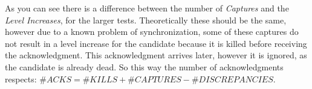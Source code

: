 	\begin{table}[h] 
		\centering
		\caption{Tests summary}\label{tab:testtable}
	\end{table}

	As you can see there is a difference between the number of \textit{Captures} and the \textit{Level Increases}, for the larger tests. Theoretically these should be the same, however due to a known problem of synchronization, some of these captures do not result in a level increase for the candidate because it is killed before receiving the acknowledgment. This acknowledgment arrives later, however it is ignored, as the candidate is already dead. So this way the number of acknowledgments respects: $\#ACKS = \#KILLS+\#CAPTURES-\#DISCREPANCIES$.

	\newpage

